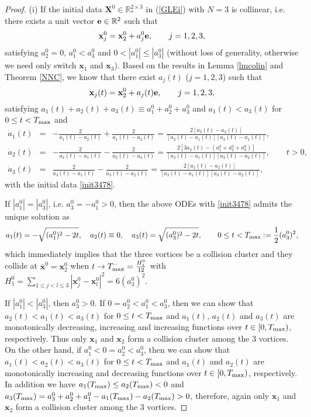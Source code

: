 \documentclass{aims}
\theoremstyle{plain}
\theoremstyle{definition}
\newcommand{\bx}{{\mathbf x}}
\newcommand{\bX}{{\mathbf X}}
\newcommand{\be} {\begin{equation}}
\newcommand{\ee}{\end{equation}}
\newcommand{\bea}{\begin{eqnarray}}
\newcommand{\eea}{\end{eqnarray} }
\begin{document}
\begin{proof} %

(i) If the initial data $\bX^0\in {\mathbb R}_*^{2\times 3}$ in (\ref{GLEi}) with $N=3$ is collinear, i.e. there exists a unit vector
${\bf e}\in {\mathbb R}^2$  such that
\be%
\bx_j^0=\bx^0_2+a_j^0 {\bf e}, \qquad j=1,2,3,\nonumber
\ee
satisfying $a_2^0=0$, $a_1^0< a_3^0$ and $0<|a_1^0|\le |a_3^0|$ (without loss of generality, otherwise we need only switch $\bx_1$ and $\bx_3$).
Based on the results in Lemma \ref{lmcolin} and Theorem \ref{NNC},
we know that there exist $a_j(t)$ ($j=1,2,3$) such that
\be%
\bx_j(t)=\bx^0_2+a_j(t) {\bf e}, \qquad j=1,2,3,\nonumber
\ee
satisfying $a_1(t)+a_2(t)+a_3(t)\equiv a_1^0+a_2^0+a_3^0$ and $a_1(t)<a_3(t)$ for $0\le t<T_{\rm max}$ and
\bea
\dot a_1(t)&=&-\frac{2}{a_1(t)-a_2(t)}+\frac{2}{a_1(t)-a_3(t)}=
\frac{2[a_3(t)-a_2(t)]}{[a_2(t)-a_1(t)][a_3(t)-a_1(t)]}, \nonumber\\
\dot a_2(t)&=&-\frac{2}{a_2(t)-a_1(t)}-\frac{2}{a_2(t)-a_3(t)}
=\frac{2[3a_2(t)-(a_1^0+a_2^0+a_3^0)]}{[a_2(t)-a_1(t)][a_3(t)-a_2(t)]},\qquad t>0,\nonumber\\
\dot a_3(t)&=&\frac{2}{a_3(t)-a_1(t)}-\frac{2}{a_3(t)-a_2(t)}
=\frac{2[a_1(t)-a_2(t)]}{[a_3(t)-a_1(t)][a_3(t)-a_2(t)]},\nonumber
\eea
with the initial data \eqref{init3478}.

If $|a_1^0|=|a_3^0|$, i.e.
$a_3^0=-a_1^0>0$, then the above ODEs with \eqref{init3478} admits the unique
solution as
\be
a_1(t)=-\sqrt{(a_1^0)^2-2t}, \quad a_2(t)\equiv 0, \quad a_3(t)=\sqrt{(a_3^0)^2-2t},
\qquad 0\le t<T_{\rm max}:=\frac{1}{2}(a_3^0)^2,\nonumber
\ee
which immediately implies that the three
vortices be a collision cluster and they  collide at $\bar\bx^0=\bx_2^0$ when
$t\to T_{\rm max}^-=\frac{H_1^0}{12}$ with $H_1^0=\sum_{1\leq j<l\leq 3}|\mathbf x_j^0-\mathbf
x_l^0|^2=6(a_3^0)^2$.

If $|a_1^0|<|a_3^0|$, then $a_3^0>0$. If $0=a_2^0<a_1^0<a_3^0$,
then we can show that $a_2(t)<a_1(t)<a_3(t)$ for $0\le t< T_{\rm max}$
and $a_1(t)$, $a_2(t)$ and $a_3(t)$ are monotonically decreasing,
increasing and increasing functions over $t\in [0,T_{\rm max})$, respectively. Thus only $\mathbf x_1$ and $\mathbf x_2$ form
a collision cluster among the $3$ vortices.
On the other hand, if $a_1^0<0=a_2^0<a_3^0$, then we can show that $a_1(t)<a_2(t)<a_3(t)$ for $0\le t< T_{\rm max}$
and $a_1(t)$ and $a_2(t)$ are monotonically increasing
and decreasing functions over $t\in [0,T_{\rm max})$, respectively.
In addition we have $a_1(T_{\rm max})\le a_2(T_{\rm max})<0$ and
$a_3(T_{\rm max})=a_3^0+a_2^0+a_1^0-a_1(T_{\rm max})-a_2(T_{\rm max})>0$,
therefore, again only $\mathbf x_1$ and $\mathbf x_2$ form
a collision cluster among the $3$ vortices.


\end{proof}
\end{document}
